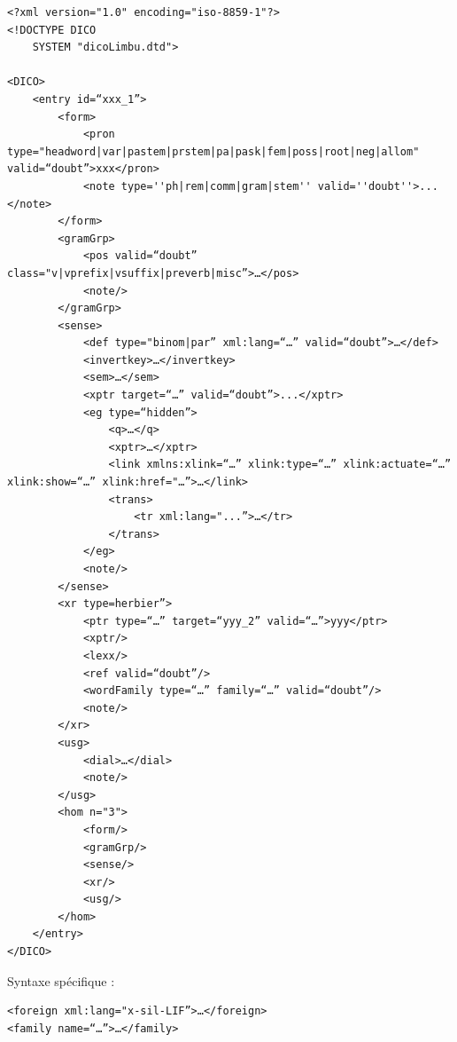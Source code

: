 \documentclass[a4paper,12pt]{article}
\begin{document}
\begin{lstlisting}[caption=Limbu example]
<?xml version="1.0" encoding="iso-8859-1"?>
<!DOCTYPE DICO
	SYSTEM "dicoLimbu.dtd">

<DICO>
	<entry id=“xxx_1”>
		<form>
			<pron type="headword|var|pastem|prstem|pa|pask|fem|poss|root|neg|allom" valid=“doubt”>xxx</pron>
			<note type=''ph|rem|comm|gram|stem'' valid=''doubt''>...</note>
		</form>
		<gramGrp>
			<pos valid=“doubt” class="v|vprefix|vsuffix|preverb|misc”>…</pos>
			<note/>
		</gramGrp>
		<sense>
			<def type="binom|par” xml:lang=“…” valid=“doubt”>…</def>
			<invertkey>…</invertkey>
			<sem>…</sem>
			<xptr target=“…” valid=“doubt”>...</xptr>
			<eg type=“hidden”>
				<q>…</q>
				<xptr>…</xptr>
				<link xmlns:xlink=“…” xlink:type=“…” xlink:actuate=“…” xlink:show=“…” xlink:href="…”>…</link>
				<trans>
					<tr xml:lang="...”>…</tr>
				</trans>
			</eg>
			<note/>
		</sense>
		<xr type=herbier”>
			<ptr type=“…” target=“yyy_2” valid=“…”>yyy</ptr>
			<xptr/>
			<lexx/>
			<ref valid=“doubt”/>
			<wordFamily type=“…” family=“…” valid=“doubt”/>
			<note/>
		</xr>
		<usg>
			<dial>…</dial>
			<note/>
		</usg>
		<hom n="3">
			<form/>
			<gramGrp/>
			<sense/>
			<xr/>
			<usg/>
		</hom>
	</entry>
</DICO>
\end{lstlisting}

Syntaxe spécifique :
\begin{lstlisting}[caption=Limbu syntax]
<foreign xml:lang="x-sil-LIF”>…</foreign>
<family name=“…”>…</family>
\end{lstlisting}
\end{document}
